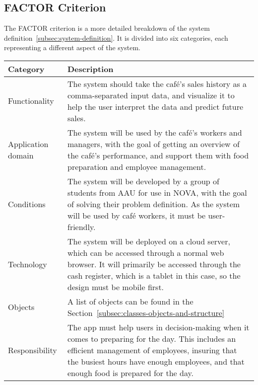 \subsection{FACTOR Criterion}\label{subsec:factor-criterion}

The FACTOR criterion is a more detailed breakdown of the system definition~\ref{subsec:system-definition}.
It is divided into six categories, each representing a different aspect of the system.

\begin{tabular}{ m{2.5cm} m{10cm} }
    \toprule
    \textbf{Category} & \textbf{Description}
    \\ \midrule
    Functionality & The system should take the café's sales history as a comma-separated input data, and visualize it to
    help the user interpret the data and predict future sales.
    \\ \midrule
    Application domain & The system will be used by the café's workers and managers, with the goal of getting an
    overview of the café's performance, and support them with food preparation and employee management.
    \\ \midrule
    Conditions & The system will be developed by a group of students from AAU for use in NOVA, with the goal of solving
    their problem definition.
    As the system will be used by café workers, it must be user-friendly.
    \\ \midrule
    Technology & The system will be deployed on a cloud server, which can be accessed through a normal web browser.
    It will primarily be accessed through the cash register, which is a tablet in this case, so the design must be
    mobile first.
    \\ \midrule
    Objects & A list of objects can be found in the Section~\ref{subsec:classes-objects-and-structure}
    \\ \midrule
    Responsibility & The app must help users in decision-making when it comes to preparing for the day.
    This includes an efficient management of employees, insuring that the busiest hours have enough employees, and
    that enough food is prepared for the day.
    \\ \bottomrule
\end{tabular}
